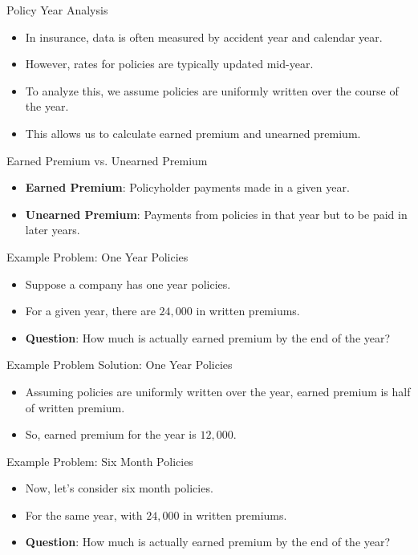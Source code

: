 \documentclass[compress,mathserif]{beamer}
\begin{document}
\begin{frame}{Policy Year Analysis}
    \begin{itemize}
        \item In insurance, data is often measured by accident year and calendar year.
        \item However, rates for policies are typically updated mid-year.
        \item To analyze this, we assume policies are uniformly written over the course of the year.
        \item This allows us to calculate earned premium and unearned premium.
    \end{itemize}
\end{frame}

\begin{frame}{Earned Premium vs. Unearned Premium}
    \begin{itemize}
        \item \textbf{Earned Premium}: Policyholder payments made in a given year.
        \item \textbf{Unearned Premium}: Payments from policies in that year but to be paid in later years.
    \end{itemize}
\end{frame}

\begin{frame}{Example Problem: One Year Policies}
    \begin{itemize}
        \item Suppose a company has one year policies.
        \item For a given year, there are $24,000$ in written premiums.
        \item \textbf{Question}: How much is actually earned premium by the end of the year?
    \end{itemize}
\end{frame}

\begin{frame}{Example Problem Solution: One Year Policies}
    \begin{itemize}
        \item Assuming policies are uniformly written over the year, earned premium is half of written premium.
        \item So, earned premium for the year is $12,000$.
    \end{itemize}
\end{frame}

\begin{frame}{Example Problem: Six Month Policies}
    \begin{itemize}
        \item Now, let's consider six month policies.
        \item For the same year, with $24,000$ in written premiums.
        \item \textbf{Question}: How much is actually earned premium by the end of the year?
    \end{itemize}
\end{frame}
\end{document}
